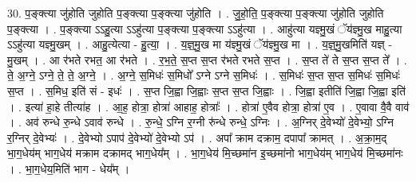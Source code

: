 \documentclass[17pt]{extarticle}
\begin{document}
30. प॒ङ्क्त्या जु॑होति जुहोति प॒ङ्क्त्या प॒ङ्क्त्या जु॑होति । . जु॒हो॒ति॒ प॒ङ्क्त्या प॒ङ्क्त्या जु॑होति जुहोति प॒ङ्क्त्या । . प॒ङ्क्त्या ऽऽहु॒त्या ऽऽहु॑त्या प॒ङ्क्त्या प॒ङ्क्त्या ऽऽहु॑त्या । . आहु॑त्या यज्ञ्मु॒खं ॅय॑ज्ञ्मु॒ख माहु॒त्या ऽऽहु॑त्या यज्ञ्मु॒खम् । . आहु॒त्येत्या - हु॒त्या॒ । . य॒ज्ञ्॒मु॒ख मा य॑ज्ञ्मु॒खं ॅय॑ज्ञ्मु॒ख मा । . य॒ज्ञ्॒मु॒खमिति॑ यज्ञ् - मु॒खम् । . आ र॑भते रभत॒ आ र॑भते । . र॒भ॒ते॒ स॒प्त स॒प्त र॑भते रभते स॒प्त । . स॒प्त ते॑ ते स॒प्त स॒प्त ते᳚ । . ते॒ अ॒ग्ने॒ ऽग्ने॒ ते॒ ते॒ अ॒ग्ने॒ । . अ॒ग्ने॒ स॒मिधः॑ स॒मिधो᳚ ऽग्ने ऽग्ने स॒मिधः॑ । . स॒मिधः॑ स॒प्त स॒प्त स॒मिधः॑ स॒मिधः॑ स॒प्त । . स॒मिध॒ इति॑ सं - इधः॑ । . स॒प्त जि॒ह्वा जि॒ह्वाः स॒प्त स॒प्त जि॒ह्वाः । . जि॒ह्वा इतीति॑ जि॒ह्वा जि॒ह्वा इति॑ । . इत्या॑ हा॒हे तीत्या॑ह । . आ॒ह॒ होत्रा॒ होत्रा॑ आहाह॒ होत्राः᳚ । . होत्रा॑ ए॒वैव होत्रा॒ होत्रा॑ ए॒व । . ए॒वावा वै॒वै वाव॑ । . अव॑ रुन्धे रु॒न्धे ऽवाव॑ रुन्धे । . रु॒न्धे॒ ऽग्नि र॒ग्नी रु॑न्धे रुन्धे॒ ऽग्निः । . अ॒ग्निर् दे॒वेभ्यो॑ दे॒वेभ्यो॒ ऽग्नि र॒ग्निर् दे॒वेभ्यः॑ । . दे॒वेभ्यो ऽपाप॑ दे॒वेभ्यो॑ दे॒वेभ्यो ऽप॑ । . अपा᳚ क्राम दक्राम॒ दपापा᳚ क्रामत् । . अ॒क्रा॒म॒द् भा॒ग॒धेय॑म् भाग॒धेय॑ मक्राम दक्रामद् भाग॒धेय᳚म् । . भा॒ग॒धेय॑ मि॒च्छमा॑न इ॒च्छमा॑नो भाग॒धेय॑म् भाग॒धेय॑ मि॒च्छमा॑नः । . भा॒ग॒धेय॒मिति॑ भाग - धेय᳚म् । \newline
\end{document}

